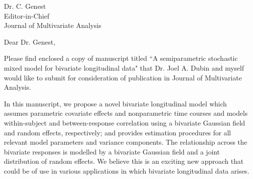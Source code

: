 \documentclass[11pt]{letter} %
\begin{document}

\begin{letter}{Dr. C. Genest \\
Editor-in-Chief  \\
Journal of Multivariate Analysis \\
} 



\signature{Kexin Ji \\
Department of Statistics and Actuarial Science \\
University of Waterloo \\
Waterloo, Ontario, Canada \\
N2L 3G1} %


\opening{Dear Dr. Genest,} 
 
Please find enclosed a copy of manuscript titled ``A semiparametric stochastic mixed model for bivariate longitudinal data" that Dr. Joel A. Dubin and myself would like to submit for consideration of publication in Journal of Multivariate Analysis.

In this manuscript, we propose a novel bivariate longitudinal model which assumes parametric covariate effects and nonparametric time courses and models within-subject and between-response correlation using a bivariate Gaussian field and random effects, respectively; and provides estimation procedures for all relevant model parameters and variance components. 
The relationship across the bivariate responses is modelled by a bivariate Gaussian field and a joint distribution of random effects.
We believe this is an exciting new approach that could be of use in various applications in which bivariate longitudinal data arises.
 

\end{letter}
\end{document}
